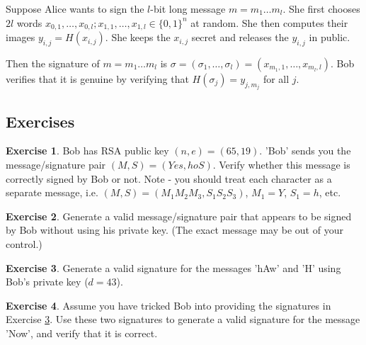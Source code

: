 \documentclass[a4paper, 11pt, openany]{book}
\numberwithin{equation}{section}
\theoremstyle{plain}
\theoremstyle{definition}
\newtheorem{exercise}   {Exercise}  [section]
\begin{document}
Suppose Alice wants to sign the $l$-bit long message $m = m_1 \dots m_l$. She first chooses $2l$ words $x_{0,1}, \dots, x_{0,l}; x_{1,1}, \dots, x_{1,l} \in \{0,1\}^n$ at random. She then computes their images $y_{i, j} = H(x_{i,j})$. She keeps the $x_{i,j}$ secret and releases the $y_{i,j}$ in public.

Then the signature of $m = m_1 \dots m_l$ is $\sigma = (\sigma_1, \dots, \sigma_l) = (x_{m_1,1}, \dots, x_{m_l,l})$. Bob verifies that it is genuine by verifying that $H(\sigma_j) = y_{j, m_j}$ for all $j$.


\subsection{Exercises}

\begin{exercise} \label{exercise:signature1}
Bob has RSA public key $(n,e)=(65,19)$. 'Bob' sends you the message/signature pair $(M,S) = (Yes,hoS)$. Verify whether this message is correctly signed by Bob or not. Note - you should treat each character as a separate message, i.e. $(M,S)=(M_1 M_2 M_3, S_1 S_2 S_3)$, $M_1=Y$, $S_1=h$, etc. 
\end{exercise}

\begin{exercise} \label{exercise:signature2}
Generate a valid message/signature pair that appears to be signed by Bob without using his private key. (The exact message may be out of your control.)
\end{exercise}

\begin{exercise} \label{exercise:signature3}
Generate a valid signature for the messages 'hAw' and 'H' using Bob's private key ($d=43$).
\end{exercise}

\begin{exercise} \label{exercise:signature4}
Assume you have tricked Bob into providing the signatures in Exercise \ref{exercise:signature3}. Use these two signatures to generate a valid signature for the message 'Now', and verify that it is correct.
\end{exercise}


\end{document}
